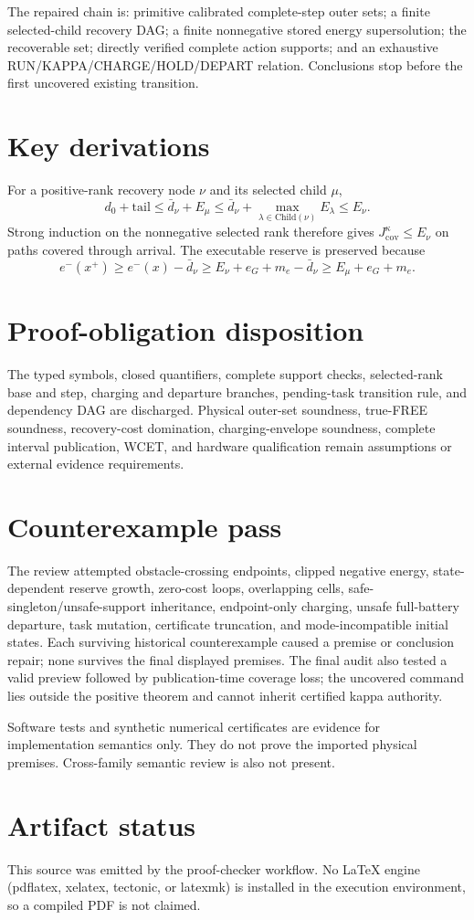 \documentclass[11pt]{article}
\newcommand{\afterbox}[1]{\par\noindent\colorbox{green!12}{\parbox{0.94\linewidth}{#1}}\par}
\newcommand{\warningbox}[1]{\par\noindent\colorbox{yellow!18}{\parbox{0.94\linewidth}{#1}}\par}
\begin{document}
\afterbox{The repaired chain is: primitive calibrated complete-step outer
sets; a finite selected-child recovery DAG; a finite nonnegative stored energy
supersolution; the recoverable set; directly verified complete action supports;
and an exhaustive RUN/KAPPA/CHARGE/HOLD/DEPART relation.  Conclusions stop
before the first uncovered existing transition.}

\section{Key derivations}
For a positive-rank recovery node $\nu$ and its selected child $\mu$,
\[
 d_0+\mathrm{tail}
 \le \bar d_\nu+E_\mu
 \le \bar d_\nu+\max_{\lambda\in\mathrm{Child}(\nu)}E_\lambda
 \le E_\nu.
\]
Strong induction on the nonnegative selected rank therefore gives
$J_{\mathrm{cov}}^\kappa\le E_\nu$ on paths covered through arrival.
The executable reserve is preserved because
\[
 e^-(x^+)\ge e^-(x)-\bar d_\nu
 \ge E_\nu+e_G+m_e-\bar d_\nu
 \ge E_\mu+e_G+m_e.
\]

\section{Proof-obligation disposition}
The typed symbols, closed quantifiers, complete support checks, selected-rank
base and step, charging and departure branches, pending-task transition rule,
and dependency DAG are discharged.  Physical outer-set soundness, true-FREE
soundness, recovery-cost domination, charging-envelope soundness, complete
interval publication, WCET, and hardware qualification remain assumptions or
external evidence requirements.

\section{Counterexample pass}
The review attempted obstacle-crossing endpoints, clipped negative energy,
state-dependent reserve growth, zero-cost loops, overlapping cells,
safe-singleton/unsafe-support inheritance, endpoint-only charging, unsafe
full-battery departure, task mutation, certificate truncation, and
mode-incompatible initial states.  Each surviving historical counterexample
caused a premise or conclusion repair; none survives the final displayed
premises.  The final audit also tested a valid preview followed by
publication-time coverage loss; the uncovered command lies outside the positive
theorem and cannot inherit certified kappa authority.

\warningbox{Software tests and synthetic numerical certificates are evidence
for implementation semantics only.  They do not prove the imported physical
premises.  Cross-family semantic review is also not present.}

\section{Artifact status}
This source was emitted by the proof-checker workflow.  No LaTeX engine
(pdflatex, xelatex, tectonic, or latexmk) is installed in the execution
environment, so a compiled PDF is not claimed.
\end{document}

